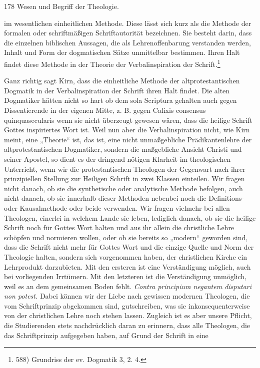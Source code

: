 178 Wesen und Begriff der Theologie.\par im wesentlichen einheitlichen Methode. Diese lässt sich kurz als die Methode der formalen oder schriftmäßigen Schriftautorität bezeichnen. Sie besteht darin, dass die einzelnen biblischen Aussagen, die als Lehrenoffenbarung verstanden werden, Inhalt und Form der dogmatischen Sätze unmittelbar bestimmen. Ihren Halt findet diese Methode in der Theorie der Verbalinspiration der Schrift.\footnote{588) Grundriss der ev. Dogmatik 3, 2. 4.}\par Ganz richtig sagt Kirn, dass die einheitliche Methode der altprotestantischen Dogmatik in der Verbalinspiration der Schrift ihren Halt findet. Die alten Dogmatiker hätten nicht so hart ob dem sola Scriptura gehalten auch gegen Dissentierende in der eigenen Mitte, z. B. gegen Calixis consensus quinquasecularis wenn sie nicht überzeugt gewesen wären, dass die heilige Schrift Gottes inspiriertes Wort ist. Weil nun aber die Verbalinspiration nicht, wie Kirn meint, eine „Theorie“ ist, das ist, eine nicht unmaßgebliche Prädikantenlehre der altprotestantischen Dogmatiker, sondern die maßgebliche Ansicht Christi und seiner Apostel, so dient es der dringend nötigen Klarheit im theologischen Unterricht, wenn wir die protestantischen Theologen der Gegenwart nach ihrer prinzipiellen Stellung zur Heiligen Schrift in zwei Klassen einteilen. Wir fragen nicht danach, ob sie die synthetische oder analytische Methode befolgen, auch nicht danach, ob sie innerhalb dieser Methoden nebenbei noch die Definitions- oder Kausalmethode oder beide verwenden. Wir fragen vielmehr bei allen Theologen, einerlei in welchem Lande sie leben, lediglich danach, ob sie die heilige Schrift noch für Gottes Wort halten und aus ihr allein die christliche Lehre schöpfen und normieren wollen, oder ob sie bereits so „modern“ geworden sind, dass die Schrift nicht mehr für Gottes Wort und die einzige Quelle und Norm der Theologie halten, sondern sich vorgenommen haben, der christlichen Kirche ein Lehrprodukt darzubieten. Mit den ersteren ist eine Verständigung möglich, auch bei vorliegenden Irrtümern. Mit den letzteren ist die Verständigung unmöglich, weil es an dem gemeinsamen Boden fehlt. \emph{Contra principium negantem disputari non potest.} Dabei können wir der Liebe nach gewissen modernen Theologen, die vom Schriftprinzip abgekommen sind, gutschreiben, was sie inkonsequenterweise von der christlichen Lehre noch stehen lassen. Zugleich ist es aber unsere Pflicht, die Studierenden stets nachdrücklich daran zu erinnern, dass alle Theologen, die das Schriftprinzip aufgegeben haben, auf Grund der Schrift in eine